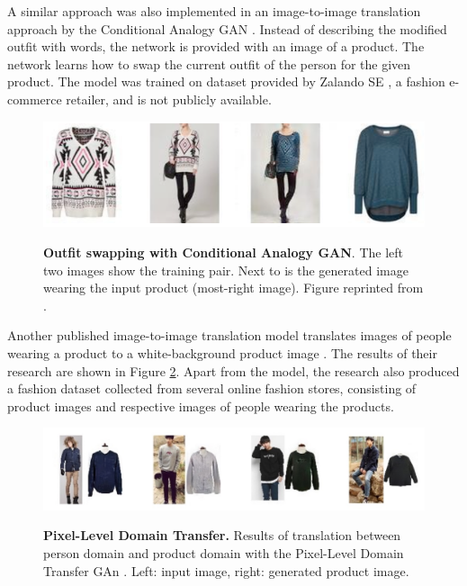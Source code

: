 \documentclass[12pt]{report}
\begin{document}
A similar approach was also implemented in an image-to-image translation approach by the Conditional Analogy GAN \cite{jetchev_conditional_2017}. Instead of describing the modified outfit with words, the network is provided with an image of a product. The network learns how to swap the current outfit of the person for the given product. The model was trained on dataset provided by Zalando SE \cite{zalando_damenmode_nodate}, a fashion e-commerce retailer, and is not publicly available.

\begin{figure}[h]
\centering
{\includegraphics[width=.8\linewidth]{03_analysis/related/cagan}}
\caption{\label{fig:swapgan} \textbf{Outfit swapping with Conditional Analogy GAN}. The left two images show the training pair. Next to is the generated image wearing the input product (most-right image). Figure reprinted from \cite{jetchev_conditional_2017}.}
\end{figure}

\pagebreak
Another published image-to-image translation model translates images of people wearing a product to a white-background product image \cite{yoo_pixel-level_2016}. The results of their research are shown in Figure \ref{fig:pixeldtgan}. Apart from the model, the research also produced a fashion dataset collected from several online fashion stores, consisting of product images and respective images of people wearing the products.

\begin{figure}[h]
\centering
{\includegraphics[width=\linewidth]{03_analysis/related/pixeldtgan}}
\caption{\label{fig:pixeldtgan} \textbf{Pixel-Level Domain Transfer.} Results of translation between person domain and product domain with the Pixel-Level Domain Transfer GAn \cite{yoo_pixel-level_2016}. Left: input image, right: generated product image.}
\end{figure}
\end{document}
